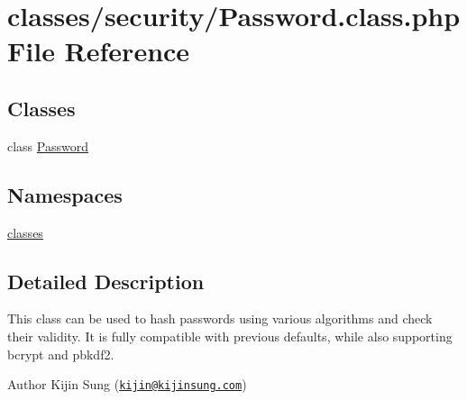 \hypertarget{Password_8class_8php}{}\section{classes/security/\+Password.class.\+php File Reference}
\label{Password_8class_8php}
\subsection*{Classes}
\begin{DoxyCompactItemize}
\item 
class \hyperlink{classPassword}{Password}
\end{DoxyCompactItemize}
\subsection*{Namespaces}
\begin{DoxyCompactItemize}
\item 
 \hyperlink{namespaceclasses}{classes}
\end{DoxyCompactItemize}


\subsection{Detailed Description}
This class can be used to hash passwords using various algorithms and check their validity. It is fully compatible with previous defaults, while also supporting bcrypt and pbkdf2.

\begin{DoxyAuthor}{Author}
Kijin Sung (\href{mailto:kijin@kijinsung.com}{\tt kijin@kijinsung.\+com}) 
\end{DoxyAuthor}
